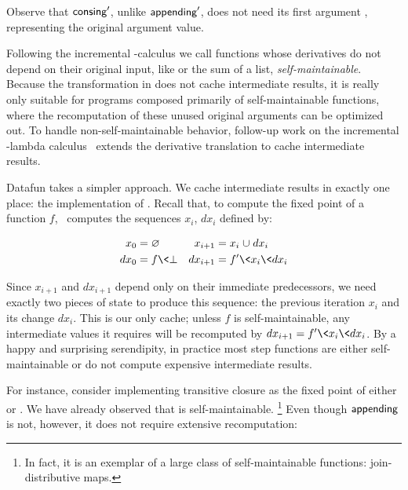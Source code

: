 \noindent
Observe that $\text{\sffamily consing}'$, unlike $\text{\sffamily appending}'$, does not need its
first argument , representing the original argument value.

Following the incremental \fn-calculus we call functions whose derivatives do
not depend on their original input, like  or the sum of a
list, \emph{self-maintainable}.
%
Because the transformation in \citet{incremental} does not cache intermediate results, it is really only suitable for programs composed primarily of self-maintainable functions, where the recomputation of these unused original arguments can be optimized out.
%
%
To handle non-self-maintainable behavior, follow-up work on the incremental
\fn-lambda calculus~\citep{DBLP:conf/esop/GiarrussoRS19} extends the derivative
translation to cache intermediate results.
%

Datafun takes a simpler approach.
%
We cache intermediate results in exactly one place: the implementation of \fastfix.
%
Recall that, to compute the fixed point of a function $f$, \fastfix\ computes the sequences $x_i$, $dx_i$ defined by:

\nopagebreak[2]
\begin{align*}
  x_0 &= \varnothing &
  x_{i + 1} &= x_i \cup dx_i\\
  dx_0 &= f \<\bot &
  dx_{i + 1} &= f' \<x_i \<dx_i
\end{align*}

\noindent
Since $x_{i + 1}$ and $dx_{i + 1}$ depend only on their immediate predecessors, we
need exactly two pieces of state to produce this sequence: the previous iteration $x_i$ and its change $dx_i$.
%
This is our only cache; unless $f$ is self-maintainable, any intermediate values it requires will be recomputed by $dx_{i + 1} = f' \<x_i \<dx_i$.
%
By a happy and surprising serendipity, in practice most step functions  are either self-maintainable or do not compute expensive intermediate results.

For instance, consider implementing transitive closure as the fixed point of either  or .
%
We have already observed that  is self-maintainable.%
%
\footnote{In fact, it is an exemplar of a large class of self-maintainable functions: join-distributive maps. 
%
}
%
Even though $\text{\sffamily appending}$ is not, however, it does not require extensive recomputation:

